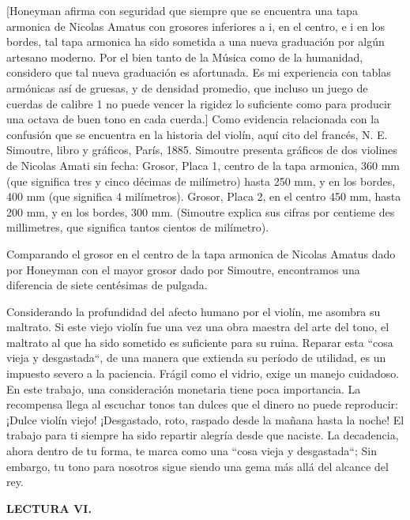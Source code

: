 \documentclass[12pt]{book}
\begin{document}
[Honeyman afirma con seguridad que siempre que se encuentra una tapa armonica de Nicolas Amatus con grosores inferiores a i, en el centro, e i en los bordes, tal tapa armonica ha sido sometida a una nueva graduación por algún artesano moderno. Por el bien tanto de la Música como de la humanidad, considero que tal nueva graduación es afortunada. Es mi experiencia con tablas armónicas así de gruesas, y de densidad promedio, que incluso un juego de cuerdas de calibre 1 no puede vencer la rigidez lo suficiente como para producir una octava de buen tono en cada cuerda.] Como evidencia relacionada con la confusión que se encuentra en la historia del violín, aquí cito del francés, N. E. Simoutre, libro y gráficos, París, 1885. Simoutre presenta gráficos de dos violines de Nicolas Amati sin fecha: Grosor, Placa 1, centro de la tapa armonica, 360 mm (que significa tres y cinco décimas de milímetro) hasta 250 mm, y en los bordes, 400 mm (que significa 4 milímetros). Grosor, Placa 2, en el centro 450 mm, hasta 200 mm, y en los bordes, 300 mm. (Simoutre explica sus cifras por centieme des millimetres, que significa tantos cientos de milímetro).

Comparando el grosor en el centro de la tapa armonica de Nicolas Amatus dado por Honeyman con el mayor grosor dado por Simoutre, encontramos una diferencia de siete centésimas de pulgada.

Considerando la profundidad del afecto humano por el violín, me asombra su maltrato. Si este viejo violín fue una vez una obra maestra del arte del tono, el maltrato al que ha sido sometido es suficiente para su ruina. Reparar esta ``cosa vieja y desgastada``, de una manera que extienda su período de utilidad, es un impuesto severo a la paciencia. Frágil como el vidrio, exige un manejo cuidadoso. En este trabajo, una consideración monetaria tiene poca importancia. La recompensa llega al escuchar tonos tan dulces que el dinero no puede reproducir: ¡Dulce violín viejo! ¡Desgastado, roto, raspado desde la mañana hasta la noche! El trabajo para ti siempre ha sido repartir alegría desde que naciste. La decadencia, ahora dentro de tu forma, te marca como una ``cosa vieja y desgastada``; Sin embargo, tu tono para nosotros sigue siendo una gema más allá del alcance del rey.

\textbf{LECTURA VI.}
\end{document}
